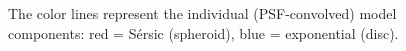 \documentclass[useAMS,usenatbib,article]{mn2e}
\begin{document}
\begin{figure}
\begin{center}
{The color lines represent the individual (PSF-convolved) model components:
red = S\'ersic (spheroid), blue = exponential (disc).
}
\label{fig:m1216}
\end{center}
\end{figure}
\end{document}
